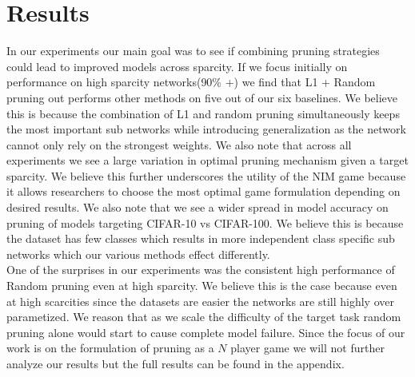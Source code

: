 \documentclass[runningheads]{llncs}
\begin{document}
\section{Results}
In our experiments our main goal was to see if combining pruning strategies could lead to improved models across sparcity. If we focus initially on performance on high sparcity networks(90\% +) we find that L1 + Random pruning out performs other methods on five out of our six baselines. We believe this is because the combination of L1 and random pruning simultaneously keeps the most important sub networks while introducing generalization as the network cannot only rely on the strongest weights. We also note that across all experiments we see a large variation in optimal pruning mechanism given a target sparcity. We believe this further underscores the utility of the NIM game because it allows researchers to choose the most optimal game formulation depending on desired results. We also note that we see a wider spread in model accuracy on pruning of models targeting CIFAR-10 vs CIFAR-100. We believe this is because the dataset has few classes which results in more independent class specific sub networks which our various methods effect differently. \\
One of the surprises in our experiments was the consistent high performance of Random pruning even at high sparcity. We believe this is the case because even at high scarcities since the datasets are easier the networks are still highly over parametized. We reason that as we scale the difficulty of the target task random pruning alone would start to cause complete model failure. Since the focus of our work is on the formulation of pruning as a $N$ player game we will not further analyze our results but the full results can be found in the appendix. 
\end{document}
